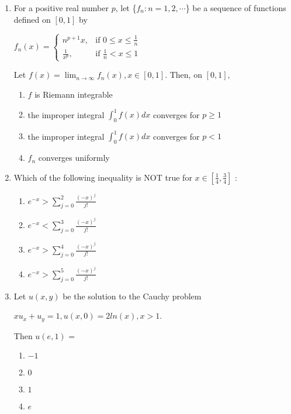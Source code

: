 \documentclass[journal]{IEEEtran}
\theoremstyle{remark}
\begin{document}
\begin{enumerate}
	\item For a positive real number $p$, let \{$f_n : n=1,2,\cdots$\} be a sequence of functions defined on $[0,1]$ by 
                \begin{center}
                   $ f_n(x) = \begin{cases}
                    n^{p+1}x, & \text{if }  0 \leq x \leq \frac{1}{n} \\
                    \frac{1}{x^p}, & \text{if }  \frac{1}{n} < x \leq 1
                    \end{cases} $
                \end{center}
                Let $f(x) = \lim_{n \to \infty} f_n(x), x \in [0, 1]$. Then, on $[0,1],$ 
                \begin{enumerate}
                    \item $f$ is Riemann integrable
                    \item the improper integral $\int_{0}^{1} f(x) dx$ converges for $p\ge 1$
                    \item the improper integral $\int_{0}^{1} f(x) dx$ converges for $p<1$
                    \item $f_n$ converges uniformly 
                \end{enumerate}

                \item Which of the following inequality is NOT true for $x \in [\frac{1}{4}, \frac{3}{4}]$ :
                \begin{multicols}{2}
                \begin{enumerate}
                    
                      \item $e^{-x} > \sum_{j=0}^{2} \frac{(-x)^j}{j!}$
                      \item $e^{-x} < \sum_{j=0}^{3} \frac{(-x)^j}{j!}$
                       \item $e^{-x} > \sum_{j=0}^{4} \frac{(-x)^j}{j!}$
                       \item $e^{-x} > \sum_{j=0}^{5} \frac{(-x)^j}{j!}$
                \end{enumerate}
                    
                \end{multicols}

                \item Let $u(x,y)$ be the solution to the Cauchy problem 
                \begin{center}
                    $xu_x+u_y = 1, u(x,0) = 2 ln(x), x>1$.
                \end{center}
                Then $u(e,1)$ =
                \begin{multicols}{4}
                \begin{enumerate}
                    \item $-1$
                    \item $0$
                    \item $1$
                    \item $e$
                \end{enumerate}
                    

\end{multicols}
\end{enumerate}
\end{document}
